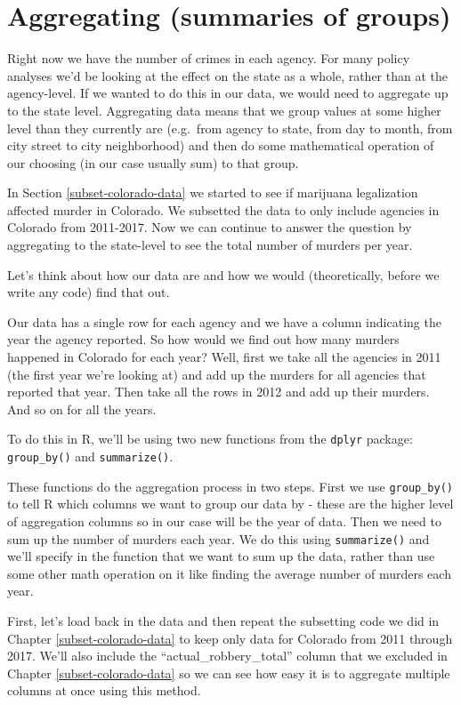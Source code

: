 \documentclass[
]{krantz}
\begin{document}
\hypertarget{aggregate}{%
\section{Aggregating (summaries of
groups)}\label{aggregate}}

Right now we have the number of crimes in each agency. For
many policy analyses we'd be looking at the effect on the
state as a whole, rather than at the agency-level. If we
wanted to do this in our data, we would need to aggregate up
to the state level. Aggregating data means that we group
values at some higher level than they currently are
(e.g.~from agency to state, from day to month, from city
street to city neighborhood) and then do some mathematical
operation of our choosing (in our case usually sum) to that
group.

In Section \ref{subset-colorado-data} we started to see if
marijuana legalization affected murder in Colorado. We
subsetted the data to only include agencies in Colorado from
2011-2017. Now we can continue to answer the question by
aggregating to the state-level to see the total number of
murders per year.

Let's think about how our data are and how we would
(theoretically, before we write any code) find that out.

Our data has a single row for each agency and we have a
column indicating the year the agency reported. So how would
we find out how many murders happened in Colorado for each
year? Well, first we take all the agencies in 2011 (the
first year we're looking at) and add up the murders for all
agencies that reported that year. Then take all the rows in
2012 and add up their murders. And so on for all the years.

To do this in R, we'll be using two new functions from the
\texttt{dplyr} package: \texttt{group\_by()} and
\texttt{summarize()}.

These functions do the aggregation process in two steps.
First we use \texttt{group\_by()} to tell R which columns we
want to group our data by - these are the higher level of
aggregation columns so in our case will be the year of data.
Then we need to sum up the number of murders each year. We
do this using \texttt{summarize()} and we'll specify in the
function that we want to sum up the data, rather than use
some other math operation on it like finding the average
number of murders each year.

First, let's load back in the data and then repeat the
subsetting code we did in Chapter \ref{subset-colorado-data}
to keep only data for Colorado from 2011 through 2017. We'll
also include the ``actual\_robbery\_total'' column that we
excluded in Chapter \ref{subset-colorado-data} so we can see
how easy it is to aggregate multiple columns at once using
this method.
\end{document}
